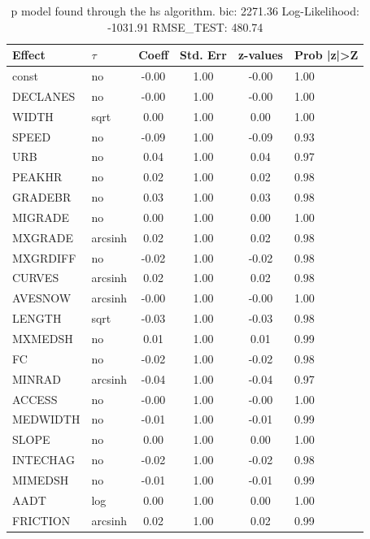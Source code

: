 \begin{table}
	\caption{p model found through the hs algorithm. bic: 2271.36 Log-Likelihood: -1031.91 RMSE_TEST: 480.74}
	\begin{center}
		\begin{tabular}{|l|l|c|c|c|l|}
			\hline
			Effect & $\tau$ & Coeff & Std. Err & z-values & Prob |z|>Z \\
			\hline
			const & no & -0.00 & 1.00 & -0.00 & 1.00 \\
			\hline
			DECLANES & no & -0.00 & 1.00 & -0.00 & 1.00 \\
			\hline
			WIDTH & sqrt & 0.00 & 1.00 & 0.00 & 1.00 \\
			\hline
			SPEED & no & -0.09 & 1.00 & -0.09 & 0.93 \\
			\hline
			URB & no & 0.04 & 1.00 & 0.04 & 0.97 \\
			\hline
			PEAKHR & no & 0.02 & 1.00 & 0.02 & 0.98 \\
			\hline
			GRADEBR & no & 0.03 & 1.00 & 0.03 & 0.98 \\
			\hline
			MIGRADE & no & 0.00 & 1.00 & 0.00 & 1.00 \\
			\hline
			MXGRADE & arcsinh & 0.02 & 1.00 & 0.02 & 0.98 \\
			\hline
			MXGRDIFF & no & -0.02 & 1.00 & -0.02 & 0.98 \\
			\hline
			CURVES & arcsinh & 0.02 & 1.00 & 0.02 & 0.98 \\
			\hline
			AVESNOW & arcsinh & -0.00 & 1.00 & -0.00 & 1.00 \\
			\hline
			LENGTH & sqrt & -0.03 & 1.00 & -0.03 & 0.98 \\
			\hline
			MXMEDSH & no & 0.01 & 1.00 & 0.01 & 0.99 \\
			\hline
			FC & no & -0.02 & 1.00 & -0.02 & 0.98 \\
			\hline
			MINRAD & arcsinh & -0.04 & 1.00 & -0.04 & 0.97 \\
			\hline
			ACCESS & no & -0.00 & 1.00 & -0.00 & 1.00 \\
			\hline
			MEDWIDTH & no & -0.01 & 1.00 & -0.01 & 0.99 \\
			\hline
			SLOPE & no & 0.00 & 1.00 & 0.00 & 1.00 \\
			\hline
			INTECHAG & no & -0.02 & 1.00 & -0.02 & 0.98 \\
			\hline
			MIMEDSH & no & -0.01 & 1.00 & -0.01 & 0.99 \\
			\hline
			AADT & log & 0.00 & 1.00 & 0.00 & 1.00 \\
			\hline
			FRICTION & arcsinh & 0.02 & 1.00 & 0.02 & 0.99 \\

\end{tabular}
\end{center}
\end{table}
